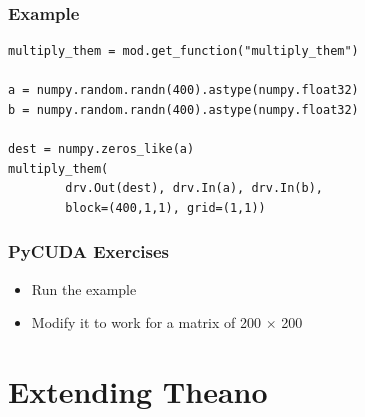 \documentclass[a4paper,9pt]{beamer}
\begin{document}
\begin{frame}[fragile]
\frametitle{Example}
\begin{Verbatim}
multiply_them = mod.get_function("multiply_them")

a = numpy.random.randn(400).astype(numpy.float32)
b = numpy.random.randn(400).astype(numpy.float32)

dest = numpy.zeros_like(a)
multiply_them(
        drv.Out(dest), drv.In(a), drv.In(b),
        block=(400,1,1), grid=(1,1))
\end{Verbatim}
\end{frame}

\begin{frame}
\frametitle{PyCUDA Exercises}
\begin{itemize}
\item Run the example
\item Modify it to work for a matrix of 200 $\times$ 200
\end{itemize}
\end{frame}


\section{Extending Theano}
\end{document}
